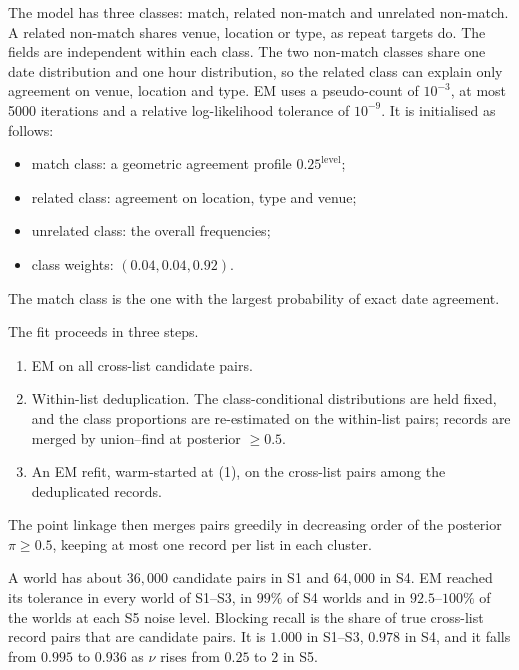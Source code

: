 The model has three classes: match, related non-match and unrelated non-match. A related non-match shares venue, location or type, as repeat targets do. The fields are independent within each class. The two non-match classes share one date distribution and one hour distribution, so the related class can explain only agreement on venue, location and type. EM uses a pseudo-count of $10^{-3}$, at most 5000 iterations and a relative log-likelihood tolerance of $10^{-9}$. It is initialised as follows:
\begin{itemize}
  \item match class: a geometric agreement profile $0.25^{\text{level}}$;
  \item related class: agreement on location, type and venue;
  \item unrelated class: the overall frequencies;
  \item class weights: $(0.04,0.04,0.92)$.
\end{itemize}
The match class is the one with the largest probability of exact date agreement.

The fit proceeds in three steps.
\begin{enumerate}[(1)]
  \item EM on all cross-list candidate pairs.
  \item Within-list deduplication. The class-conditional distributions are held fixed, and the class proportions are re-estimated on the within-list pairs; records are merged by union--find at posterior $\ge0.5$.
  \item An EM refit, warm-started at (1), on the cross-list pairs among the deduplicated records.
\end{enumerate}
The point linkage then merges pairs greedily in decreasing order of the posterior $\pi\ge0.5$, keeping at most one record per list in each cluster.

A world has about $36{,}000$ candidate pairs in S1 and $64{,}000$ in S4. EM reached its tolerance in every world of S1--S3, in $99\%$ of S4 worlds and in $92.5$--$100\%$ of the worlds at each S5 noise level. Blocking recall is the share of true cross-list record pairs that are candidate pairs. It is $1.000$ in S1--S3, $0.978$ in S4, and it falls from $0.995$ to $0.936$ as $\nu$ rises from $0.25$ to $2$ in S5.

